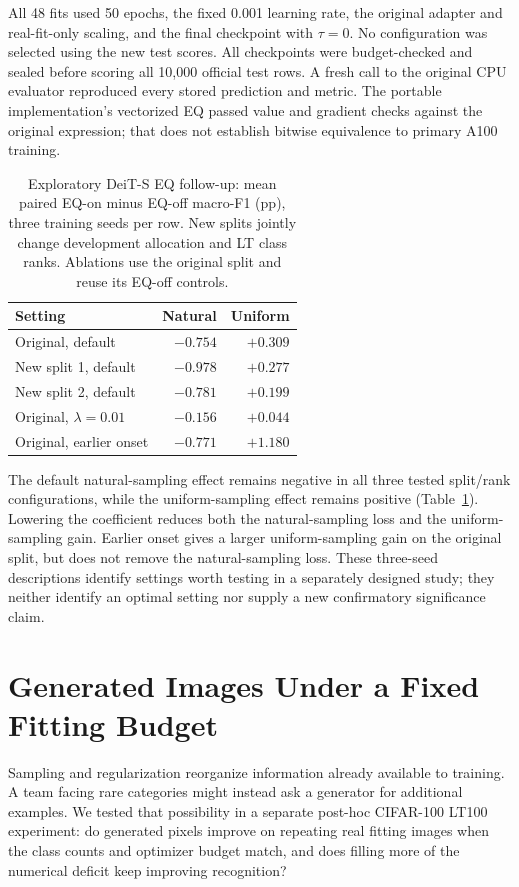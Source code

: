 \documentclass[conference]{IEEEtran}
\begin{document}
All 48 fits used 50 epochs, the fixed 0.001 learning rate, the original adapter and real-fit-only scaling, and the final checkpoint with $\tau=0$. No configuration was selected using the new test scores. All checkpoints were budget-checked and sealed before scoring all 10,000 official test rows. A fresh call to the original CPU evaluator reproduced every stored prediction and metric. The portable implementation's vectorized EQ passed value and gradient checks against the original expression; that does not establish bitwise equivalence to primary A100 training.

\begin{table}[t]
\centering\footnotesize
\caption{Exploratory DeiT-S EQ follow-up: mean paired EQ-on minus EQ-off macro-F1 (pp), three training seeds per row. New splits jointly change development allocation and LT class ranks. Ablations use the original split and reuse its EQ-off controls.}
\label{tab:eqfollow}
\begin{tabular}{lrr}
\toprule
Setting & Natural & Uniform \\
\midrule
Original, default & $-0.754$ & $+0.309$ \\
New split 1, default & $-0.978$ & $+0.277$ \\
New split 2, default & $-0.781$ & $+0.199$ \\
Original, $\lambda=0.01$ & $-0.156$ & $+0.044$ \\
Original, earlier onset & $-0.771$ & $+1.180$ \\
\bottomrule
\end{tabular}
\end{table}

The default natural-sampling effect remains negative in all three tested split/rank configurations, while the uniform-sampling effect remains positive (Table~\ref{tab:eqfollow}). Lowering the coefficient reduces both the natural-sampling loss and the uniform-sampling gain. Earlier onset gives a larger uniform-sampling gain on the original split, but does not remove the natural-sampling loss. These three-seed descriptions identify settings worth testing in a separately designed study; they neither identify an optimal setting nor supply a new confirmatory significance claim.

\section{Generated Images Under a Fixed Fitting Budget}
\label{sec:generated}
Sampling and regularization reorganize information already available to training. A team facing rare categories might instead ask a generator for additional examples. We tested that possibility in a separate post-hoc CIFAR-100 LT100 experiment: do generated pixels improve on repeating real fitting images when the class counts and optimizer budget match, and does filling more of the numerical deficit keep improving recognition?
\end{document}
